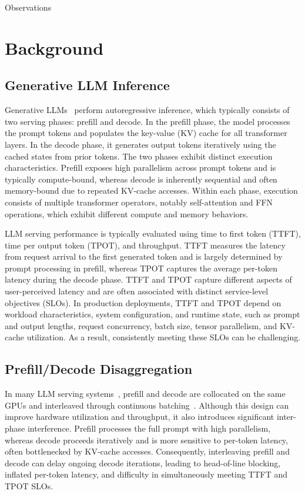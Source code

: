 Observations\section{Background}
\label{sec:background}
\subsection{Generative LLM Inference}

Generative LLMs~\cite{XX} perform autoregressive inference, which typically consists of two serving phases: prefill and decode. In the prefill phase, the model processes the prompt tokens and populates the key-value (KV) cache for all transformer layers. In the decode phase, it generates output tokens iteratively using the cached states from prior tokens. The two phases exhibit distinct execution characteristics. Prefill exposes high parallelism across prompt tokens and is typically compute-bound, whereas decode is inherently sequential and often memory-bound due to repeated KV-cache accesses. Within each phase, execution consists of multiple transformer operators, notably self-attention and FFN operations, which exhibit different compute and memory behaviors.

LLM serving performance is typically evaluated using time to first token (TTFT), time per output token (TPOT), and throughput. TTFT measures the latency from request arrival to the first generated token and is largely determined by prompt processing in prefill, whereas TPOT captures the average per-token latency during the decode phase. TTFT and TPOT capture different aspects of user-perceived latency and are often associated with distinct service-level objectives (SLOs). In production deployments, TTFT and TPOT depend on workload characteristics, system configuration, and runtime state, such as prompt and output lengths, request concurrency, batch size, tensor parallelism, and KV-cache utilization. As a result, consistently meeting these SLOs can be challenging.

\subsection{Prefill/Decode Disaggregation}
\label{sec2.2}

In many LLM serving systems~\cite{XX}, prefill and decode are collocated on the same GPUs and interleaved through continuous batching~\cite{XX}. Although this design can improve hardware utilization and throughput, it also introduces significant inter-phase interference. Prefill processes the full prompt with high parallelism, whereas decode proceeds iteratively and is more sensitive to per-token latency, often bottlenecked by KV-cache accesses. Consequently, interleaving prefill and decode can delay ongoing decode iterations, leading to head-of-line blocking, inflated per-token latency, and difficulty in simultaneously meeting TTFT and TPOT SLOs.

